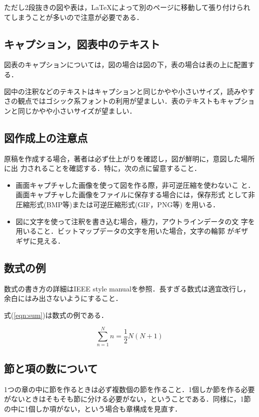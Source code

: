\documentclass[twoside]{wiss}
\begin{document}
ただし2段抜きの図や表は，\LaTeX によって別のページに移動して張り付けられ
てしまうことが多いので注意が必要である．

\subsection{キャプション，図表中のテキスト}
図表のキャプションについては，図の場合は図の下，表の場合は表の上に配置する．

図中の注釈などのテキストはキャプションと同じかやや小さいサイズ，読みやすさの観点ではゴシック系フォントの利用が望ましい．表のテキストもキャプションと同じかやや小さいサイズが望ましい．

\subsection{図作成上の注意点}
原稿を作成する場合，著者は必ず仕上がりを確認し，図が鮮明に，意図した場所に出
力されることを確認する．特に，次の点に留意すること．
\begin{itemize}

 \item 画面キャプチャした画像を使って図を作る際，非可逆圧縮を使わないこ
       と．画面キャプチャした画像をファイルに保存する場合には，保存形式
       として非圧縮形式(BMP等)または可逆圧縮形式(GIF，PNG等) を用いる．

 \item 図に文字を使って注釈を書き込む場合，極力，アウトラインデータの文
       字を用いること．ビットマップデータの文字を用いた場合，文字の輪郭
       がギザギザに見える．
\end{itemize}

\subsection{数式の例}
数式の書き方の詳細はIEEE style manual\cite{ieee}を参照．長すぎる数式は適宜改行し，余白にはみ出さないようにすること．

式(\ref{eqn:sum})は数式の例である．

\begin{equation}
\sum^{N}_{n=1}n = \frac{1}{2}N(N+1)
\label{eqn:sum}
\end{equation}

\subsection{節と項の数について}
1つの章の中に節を作るときは必ず複数個の節を作ること．1個しか節を作る必要がないときはそもそも節に分ける必要がない，ということである．同様に，1節の中に1個しか項がない，という場合も章構成を見直す．
\end{document}
